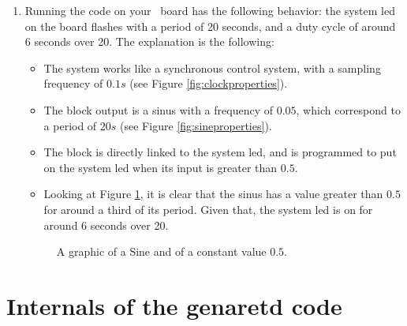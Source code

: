 \begin{enumerate}
\item
  Running the code on your \flex\ board has the following behavior: the
  system led on the board flashes with a period of 20 seconds, and a
  duty cycle of around 6 seconds over 20. The explanation is the
  following: 
  \begin{itemize}
  \item
    The system works like a synchronous control system, with a
    sampling frequency of $0.1 s$ (see Figure
    \ref{fig:clockproperties}).
  \item
    The  block output is a sinus with a frequency of
    $0.05$, which correspond to a period of $20 s$ (see Figure
    \ref{fig:sineproperties}).
  \item
    The  block is directly linked to the system led, and is
    programmed to put on the system led when its input is greater than
    $0.5$.
  \item
    Looking at Figure \ref{fig:graphic}, it is clear that the sinus
    has a value greater than $0.5$ for around a third of its
    period. Given that, the system led is on for around 6 seconds over
    20.
  \end{itemize}
%
\begin{figure}[htb]
\caption{A graphic of a Sine and of a constant value $0.5$.}
\label{fig:graphic}
\end{figure}

\end{enumerate}
  
\chapter{Internals of the genaretd code}
\label{ch:internals}

